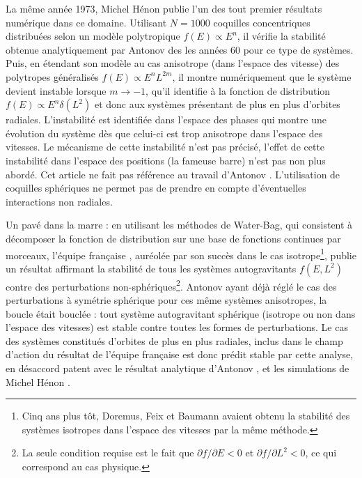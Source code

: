 La m\^{e}me ann\'{e}e 1973, Michel H\'{e}non \cite{henon} publie l'un des tout
premier r\'{e}sultats num\'{e}rique dans ce domaine. Utilisant $N=1000$
coquilles concentriques distribu\'{e}es selon un mod\`{e}le
polytropique $f\left(  E\right)  \propto E^{n}$, il v\'{e}rifie la
stabilit\'{e} obtenue analytiquement par Antonov des les ann\'{e}es 60 pour ce type de systèmes. Puis,
en \'{e}tendant son mod\`{e}le au cas anisotrope (dans l'espace des vitesse)
des polytropes g\'{e}n\'{e}ralis\'{e}s  $f\left(  E\right)  \propto
E^{n}L^{2m}$, il montre num\'{e}riquement que le syst\`{e}me devient instable
lorsque $m\rightarrow-1$, qu'il identifie \`{a} la fonction de distribution
 $f\left(  E\right)  \propto E^{n}\delta\left(  L^{2}\right) $ et donc aux
syst\`{e}mes pr\'{e}sentant de plus en plus d'orbites radiales.
L'instabilit\'{e} est identifi\'{e}e dans l'espace des phases qui montre une
\'{e}volution du syst\`{e}me d\`{e}s que celui-ci est trop anisotrope dans
l'espace des vitesses. Le m\'{e}canisme de cette instabilit\'{e} n'est pas
pr\'{e}cis\'{e}, l'effet de cette instabilit\'{e} dans l'espace des positions
(la fameuse barre) n'est pas non plus abordé. Cet article ne fait pas
r\'{e}f\'{e}rence au travail d'Antonov \cite{antonov}. L'utilisation de coquilles
sph\'{e}riques ne permet pas de prendre en compte d'\'{e}ventuelles
interactions non radiales.

Un pav\'{e} dans la marre : en utilisant les m\'{e}thodes de Water-Bag, qui
consistent \`{a} d\'{e}composer la fonction de distribution sur une base de
fonctions continues par morceaux, l'\'{e}quipe fran\c{c}aise \cite{waterbag},
aur\'{e}ol\'{e}e par son succ\`{e}s dans le cas isotrope\footnote{Cinq ans
plus t\^{o}t, Doremus, Feix et Baumann avaient obtenu la stabilit\'{e} des
syst\`{e}mes isotropes dans l'espace des vitesses par la m\^{e}me
m\'{e}thode.}, publie un r\'{e}sultat affirmant la stabilit\'{e} de tous les
syst\`{e}mes autogravitants $f\left(  E,L^{2}\right)  $ contre des
perturbations non-sph\'{e}riques\footnote{La seule condition requise est le
fait que $\partial f/\partial E<0$ et $\partial f/\partial L^{2}<0$, ce qui
correspond au cas physique.}. Antonov ayant d\'{e}j\`{a} r\'{e}gl\'{e} le cas
des perturbations \`{a} sym\'{e}trie sph\'{e}rique pour ces m\^{e}me
syst\`{e}mes anisotropes, la boucle \'{e}tait boucl\'{e}e : tout syst\`{e}me
autogravitant sph\'{e}rique (isotrope ou non dans l'espace des vitesses) est
stable contre toutes les formes de perturbations. Le cas des syst\`{e}mes
constitu\'{e}s d'orbites de plus en plus radiales, inclus dans le champ
d'action du r\'{e}sultat de l'\'{e}quipe fran\c{c}aise est donc pr\'{e}dit
stable par cette analyse, en d\'{e}saccord patent avec le r\'{e}sultat
analytique d'Antonov \cite{antonov}, et les simulations de Michel H\'{e}non \cite{henon}.

